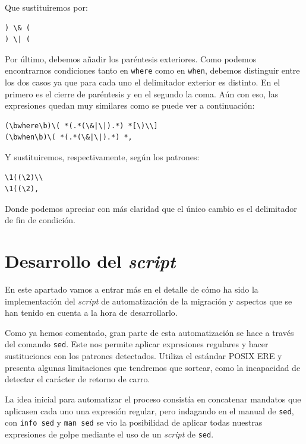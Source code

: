 \documentclass[12pt,twoside,titlepage]{report}
\begin{document}
Que sustituiremos por:

\begin{lstlisting}
) \& (
) \| (
\end{lstlisting}

Por último, debemos añadir los paréntesis exteriores. Como podemos encontrarnos condiciones tanto en \texttt{where} como en \texttt{when}, debemos distinguir entre los dos casos ya que para cada uno el delimitador exterior es distinto. En el primero es el cierre de paréntesis y en el segundo la coma. Aún con eso, las expresiones quedan muy similares como se puede ver a continuación:

\begin{lstlisting}
(\bwhere\b)\( *(.*(\&|\|).*) *[\)\\]
(\bwhen\b)\( *(.*(\&|\|).*) *,
\end{lstlisting}

Y sustituiremos, respectivamente, según los patrones:

\begin{lstlisting}
\1((\2)\\
\1((\2),
\end{lstlisting}

Donde podemos apreciar con más claridad que el único cambio es el delimitador de fin de condición.

\section{Desarrollo del \textit{script}}
\label{apendicescript}

En este apartado vamos a entrar más en el detalle de cómo ha sido la implementación del \textit{script} de automatización de la migración y aspectos que se han tenido en cuenta a la hora de desarrollarlo.

Como ya hemos comentado, gran parte de esta automatización se hace a través del comando \texttt{sed}. Este nos permite aplicar expresiones regulares y hacer sustituciones con los patrones detectados. Utiliza el estándar POSIX ERE y presenta algunas limitaciones que tendremos que sortear, como la incapacidad de detectar el carácter de retorno de carro.

La idea inicial para automatizar el proceso consistía en concatenar mandatos que aplicasen cada uno una expresión regular, pero indagando en el manual de \texttt{sed}, con \texttt{info sed} y \texttt{man sed} se vio la posibilidad de aplicar todas nuestras expresiones de golpe mediante el uso de un \textit{script} de \texttt{sed}.
\end{document}
